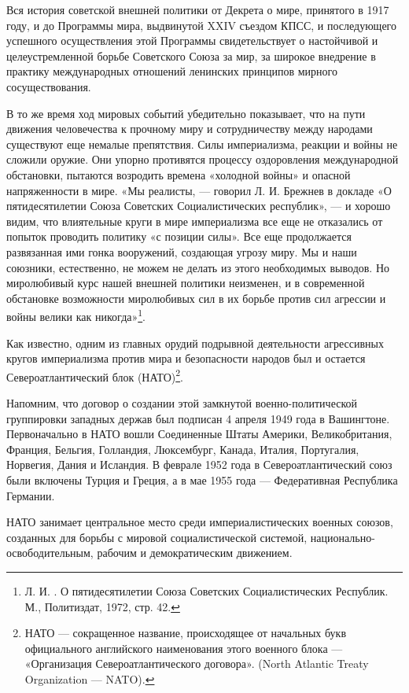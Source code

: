\documentclass[12pt, a4paper, openany]{book}
\begin{document}
Вся история советской внешней политики от Декрета о мире, принятого в 1917 году, и до Программы мира, выдвинутой XXIV съездом КПСС, и последующего успешного осуществления этой Программы свидетельствует о настойчивой и целеустремленной борьбе Советского Союза за мир, за широкое внедрение в практику международных отношений ленинских принципов мирного сосуществования.

В то же время ход мировых событий убедительно показывает, что на пути движения человечества к прочному миру и сотрудничеству между народами существуют еще немалые препятствия. Силы империализма, реакции и войны не сложили оружие. Они упорно противятся процессу оздоровления международной обстановки, пытаются возродить времена «холодной войны» и опасной напряженности в мире. «Мы реалисты, — говорил Л. И. Брежнев в докладе «О пятидесятилетии Союза Советских Социалистических республик», — и хорошо видим, что влиятельные круги в мире империализма все еще не отказались от попыток проводить политику «с позиции силы». Все еще продолжается развязанная ими гонка вооружений, создающая угрозу миру. Мы и наши союзники, естественно, не можем не делать из этого необходимых выводов. Но миролюбивый курс нашей внешней политики неизменен, и в современной обстановке возможности миролюбивых сил в их борьбе против сил агрессии и войны велики как никогда»{\footnote{Л. И. . О пятидесятилетии Союза Советских Социалистических Республик. М., Политиздат, 1972, стр. 42.}}.

Как известно, одним из главных орудий подрывной деятельности агрессивных кругов империализма против мира и безопасности народов был и остается Североатлантический блок (НАТО){\footnote{НАТО — сокращенное название, происходящее от начальных букв официального английского наименования этого военного блока — «Организация Североатлантического договора». (North Atlantic Treaty Organization — NATO).}}.

Напомним, что договор о создании этой замкнутой военно-политической группировки западных держав был подписан 4 апреля 1949 года в Вашингтоне. Первоначально в НАТО вошли Соединенные Штаты Америки, Великобритания, Франция, Бельгия, Голландия, Люксембург, Канада, Италия, Португалия, Норвегия, Дания и Исландия. В феврале 1952 года в Североатлантический союз были включены Турция и Греция, а в мае 1955 года — Федеративная Республика Германии.

НАТО занимает центральное место среди империалистических военных союзов, созданных для борьбы с мировой социалистической системой, национально-освободительным, рабочим и демократическим движением.
\end{document}
